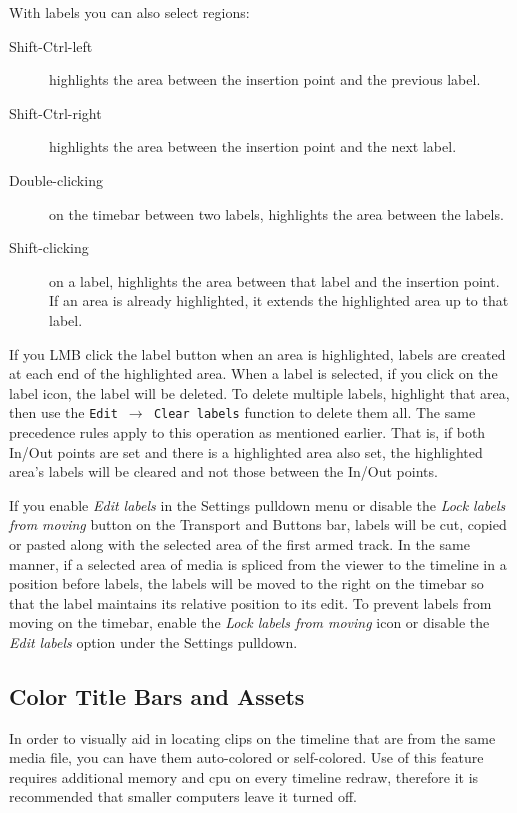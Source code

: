 With labels you can also select regions:

\begin{description}
    \item[Shift-Ctrl-left] highlights the area between the insertion point and the previous label.
    \item[Shift-Ctrl-right] highlights the area between the insertion point and the next label.
    \item[Double-clicking] on the timebar between two labels, highlights the area between the labels.	   
    \item[Shift-clicking] on a label, highlights the area between that label and the insertion point.
        If an area is already highlighted, it extends the highlighted area up to that label.
\end{description}

If you LMB click the label button when an area is highlighted, labels are created at each end of the
highlighted area. 
When a label is selected, if you click on the label icon, the label will be deleted. 
To delete multiple labels, highlight that area, then use the \texttt{Edit $\rightarrow$ Clear labels}
function to delete them all. The same precedence rules apply to this operation as mentioned earlier.  That
is, if both In/Out points are set and there is a highlighted area also set, the highlighted area's 
labels will be cleared and not those between the In/Out points.

If you enable \emph{Edit labels} in the Settings pulldown menu or disable the \emph{Lock labels from moving}
button on the Transport and Buttons bar, labels will be cut, copied or pasted along with the selected
area of the first armed track. 
In the same manner, if a selected area of media is spliced from the viewer to the timeline in a position 
before labels, the labels will be moved to the right on the timebar so that the label maintains its 
relative position to its edit. 
To prevent labels from moving on the timebar, enable the \emph{Lock labels from moving} icon or
disable the \emph{Edit labels} option under the Settings pulldown.

\subsection{Color Title Bars and Assets}%
\label{sub:color_title_bars_and_assets}

In order to visually aid in locating clips on the timeline that are from the same media file, you can have them auto-colored or self-colored.  
Use of this feature requires additional memory and cpu on every timeline redraw, therefore it is recommended that smaller computers leave it turned off.

